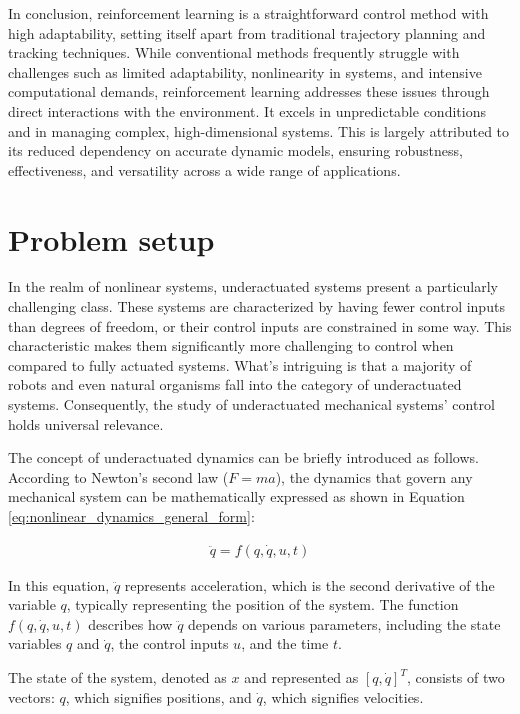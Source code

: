 In conclusion, reinforcement learning is a straightforward control method with high adaptability, setting itself apart from traditional trajectory planning and tracking techniques. While conventional methods frequently struggle with challenges such as limited adaptability, nonlinearity in systems, and intensive computational demands, reinforcement learning addresses these issues through direct interactions with the environment. It excels in unpredictable conditions and in managing complex, high-dimensional systems. This is largely attributed to its reduced dependency on accurate dynamic models, ensuring robustness, effectiveness, and versatility across a wide range of applications.


\section{Problem setup}
In the realm of nonlinear systems, underactuated systems\cite{liu2013survey} present a particularly challenging class. These systems are characterized by having fewer control inputs than degrees of freedom, or their control inputs are constrained in some way. This characteristic makes them significantly more challenging to control when compared to fully actuated systems. What's intriguing is that a majority of robots and even natural organisms fall into the category of underactuated systems. Consequently, the study of underactuated mechanical systems' control holds universal relevance.

The concept of underactuated dynamics can be briefly introduced as follows. According to Newton's second law (\( F = ma \)), the dynamics that govern any mechanical system can be mathematically expressed as shown in Equation \ref{eq:nonlinear_dynamics_general_form}:

\begin{align}
    \ddot{q} = f(q, \dot{q}, u, t)
    \label{eq:nonlinear_dynamics_general_form}
\end{align}

In this equation, \( \ddot{q} \) represents acceleration, which is the second derivative of the variable \( q \), typically representing the position of the system. The function \( f(q, \dot{q}, u, t) \) describes how \( \ddot{q} \) depends on various parameters, including the state variables \( q \) and \( \dot{q} \), the control inputs \( u \), and the time \( t \).

The state of the system, denoted as \( x \) and represented as \( [q, \dot{q}]^T \), consists of two vectors: \( q \), which signifies positions, and \( \dot{q} \), which signifies velocities.

